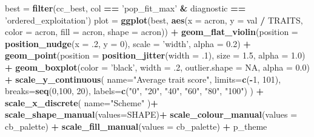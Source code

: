 \documentclass[]{book}
\newenvironment{Shaded}{\begin{snugshade}}{\end{snugshade}}
\newcommand{\DataTypeTok}[1]{\textcolor[rgb]{0.13,0.29,0.53}{#1}}
\newcommand{\DecValTok}[1]{\textcolor[rgb]{0.00,0.00,0.81}{#1}}
\newcommand{\FloatTok}[1]{\textcolor[rgb]{0.00,0.00,0.81}{#1}}
\newcommand{\KeywordTok}[1]{\textcolor[rgb]{0.13,0.29,0.53}{\textbf{#1}}}
\newcommand{\NormalTok}[1]{#1}
\newcommand{\OperatorTok}[1]{\textcolor[rgb]{0.81,0.36,0.00}{\textbf{#1}}}
\newcommand{\OtherTok}[1]{\textcolor[rgb]{0.56,0.35,0.01}{#1}}
\newcommand{\StringTok}[1]{\textcolor[rgb]{0.31,0.60,0.02}{#1}}
\begin{document}
\begin{Shaded}
\begin{Highlighting}[]
\NormalTok{best =}\StringTok{ }\KeywordTok{filter}\NormalTok{(cc_best, col }\OperatorTok{==}\StringTok{ 'pop_fit_max'} \OperatorTok{&}\StringTok{ }\NormalTok{diagnostic }\OperatorTok{==}\StringTok{ 'ordered_exploitation'}\NormalTok{)}
\NormalTok{plot =}\StringTok{ }\KeywordTok{ggplot}\NormalTok{(best, }\KeywordTok{aes}\NormalTok{(}\DataTypeTok{x =}\NormalTok{ acron, }\DataTypeTok{y =}\NormalTok{ val }\OperatorTok{/}\StringTok{ }\NormalTok{TRAITS, }\DataTypeTok{color =}\NormalTok{ acron, }\DataTypeTok{fill =}\NormalTok{ acron, }\DataTypeTok{shape =}\NormalTok{ acron)) }\OperatorTok{+}
\StringTok{  }\KeywordTok{geom_flat_violin}\NormalTok{(}\DataTypeTok{position =} \KeywordTok{position_nudge}\NormalTok{(}\DataTypeTok{x =} \FloatTok{.2}\NormalTok{, }\DataTypeTok{y =} \DecValTok{0}\NormalTok{), }\DataTypeTok{scale =} \StringTok{'width'}\NormalTok{, }\DataTypeTok{alpha =} \FloatTok{0.2}\NormalTok{) }\OperatorTok{+}
\StringTok{  }\KeywordTok{geom_point}\NormalTok{(}\DataTypeTok{position =} \KeywordTok{position_jitter}\NormalTok{(}\DataTypeTok{width =} \FloatTok{.1}\NormalTok{), }\DataTypeTok{size =} \FloatTok{1.5}\NormalTok{, }\DataTypeTok{alpha =} \FloatTok{1.0}\NormalTok{) }\OperatorTok{+}
\StringTok{  }\KeywordTok{geom_boxplot}\NormalTok{(}\DataTypeTok{color =} \StringTok{'black'}\NormalTok{, }\DataTypeTok{width =} \FloatTok{.2}\NormalTok{, }\DataTypeTok{outlier.shape =} \OtherTok{NA}\NormalTok{, }\DataTypeTok{alpha =} \FloatTok{0.0}\NormalTok{) }\OperatorTok{+}
\StringTok{  }\KeywordTok{scale_y_continuous}\NormalTok{(}
    \DataTypeTok{name=}\StringTok{"Average trait score"}\NormalTok{,}
    \DataTypeTok{limits=}\KeywordTok{c}\NormalTok{(}\OperatorTok{-}\DecValTok{1}\NormalTok{, }\DecValTok{101}\NormalTok{),}
    \DataTypeTok{breaks=}\KeywordTok{seq}\NormalTok{(}\DecValTok{0}\NormalTok{,}\DecValTok{100}\NormalTok{, }\DecValTok{20}\NormalTok{),}
    \DataTypeTok{labels=}\KeywordTok{c}\NormalTok{(}\StringTok{"0"}\NormalTok{, }\StringTok{"20"}\NormalTok{, }\StringTok{"40"}\NormalTok{, }\StringTok{"60"}\NormalTok{, }\StringTok{"80"}\NormalTok{, }\StringTok{"100"}\NormalTok{)}
\NormalTok{  ) }\OperatorTok{+}
\StringTok{  }\KeywordTok{scale_x_discrete}\NormalTok{(}
    \DataTypeTok{name=}\StringTok{"Scheme"}
\NormalTok{  )}\OperatorTok{+}
\StringTok{  }\KeywordTok{scale_shape_manual}\NormalTok{(}\DataTypeTok{values=}\NormalTok{SHAPE)}\OperatorTok{+}
\StringTok{  }\KeywordTok{scale_colour_manual}\NormalTok{(}\DataTypeTok{values =}\NormalTok{ cb_palette) }\OperatorTok{+}
\StringTok{  }\KeywordTok{scale_fill_manual}\NormalTok{(}\DataTypeTok{values =}\NormalTok{ cb_palette) }\OperatorTok{+}
\StringTok{  }\NormalTok{p_theme}


\end{Highlighting}
\end{Shaded}
\end{document}

